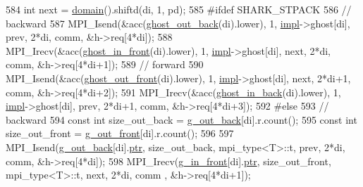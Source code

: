 \begin{DoxyCode}
584                 \textcolor{keywordtype}{int} next = \hyperlink{classshark_1_1ndim_1_1_global_array_a435ee8ff23c3feadf2ef2be64d4f375c}{domain}().shiftd(di,  1, pd);
585 \textcolor{preprocessor}{#ifdef SHARK\_STPACK}
586                 \textcolor{comment}{// backward}
587                 MPI\_Isend(&acc(\hyperlink{classshark_1_1ndim_1_1_global_array_ae4618013580af820c76c7e48d6de874a}{ghost\_out\_back}(di).lower), 1, \hyperlink{classshark_1_1ndim_1_1_global_array_a70684121da4badfef791c15d7076282f}{impl}->ghost[di], prev, 2*di,
       comm, &h->req[4*di]);
588                 MPI\_Irecv(&acc(\hyperlink{classshark_1_1ndim_1_1_global_array_a8432959070aee7062f09cae8e7f20097}{ghost\_in\_front}(di).lower), 1, \hyperlink{classshark_1_1ndim_1_1_global_array_a70684121da4badfef791c15d7076282f}{impl}->ghost[di], next, 2*di,
       comm, &h->req[4*di+1]);
589                 \textcolor{comment}{// forward}
590                 MPI\_Isend(&acc(\hyperlink{classshark_1_1ndim_1_1_global_array_ad004cd3a0deeaee55d7f3590063d5a20}{ghost\_out\_front}(di).lower), 1, 
      \hyperlink{classshark_1_1ndim_1_1_global_array_a70684121da4badfef791c15d7076282f}{impl}->ghost[di], next, 2*di+1, comm, &h->req[4*di+2]);
591                 MPI\_Irecv(&acc(\hyperlink{classshark_1_1ndim_1_1_global_array_a55074d9d00de584f5817668e0c69f58a}{ghost\_in\_back}(di).lower), 1, \hyperlink{classshark_1_1ndim_1_1_global_array_a70684121da4badfef791c15d7076282f}{impl}->ghost[di], prev, 2*di+1,
       comm, &h->req[4*di+3]);
592 \textcolor{preprocessor}{#else}
593                 \textcolor{comment}{// backward}
594                 \textcolor{keyword}{const} \textcolor{keywordtype}{int} size\_out\_back   = \hyperlink{classshark_1_1ndim_1_1_global_array_a1f7c189d498d7e7c1c79d9a613d1c5a9}{g\_out\_back}[di].r.count();
595                 \textcolor{keyword}{const} \textcolor{keywordtype}{int} size\_out\_front  = \hyperlink{classshark_1_1ndim_1_1_global_array_ad811cd36846992d5671148e7da49bb04}{g\_out\_front}[di].r.count();
596 
597                 MPI\_Isend(\hyperlink{classshark_1_1ndim_1_1_global_array_a1f7c189d498d7e7c1c79d9a613d1c5a9}{g\_out\_back}[di].\hyperlink{classshark_1_1ndim_1_1_global_array_ad4af3b8307a3a7107186cf699b5a2432}{ptr}, size\_out\_back, mpi\_type<T>::t, prev, 2*di, comm,
       &h->req[4*di]);
598                 MPI\_Irecv(\hyperlink{classshark_1_1ndim_1_1_global_array_a2f3fe48d925bc0c3a489b83203eaddfe}{g\_in\_front}[di].\hyperlink{classshark_1_1ndim_1_1_global_array_ad4af3b8307a3a7107186cf699b5a2432}{ptr}, size\_out\_front, mpi\_type<T>::t, next, 2*di, comm
      , &h->req[4*di+1]);

\end{DoxyCode}
